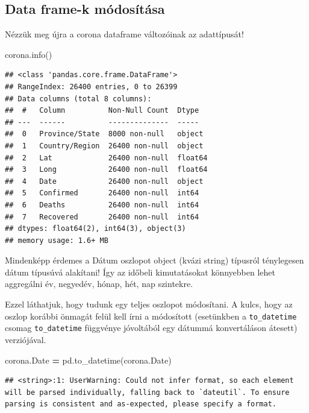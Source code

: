 \documentclass[
]{book}
\newenvironment{Shaded}{\begin{snugshade}}{\end{snugshade}}
\newcommand{\NormalTok}[1]{#1}
\newcommand{\OperatorTok}[1]{\textcolor[rgb]{0.81,0.36,0.00}{\textbf{#1}}}
\begin{document}
\subsection{Data frame-k módosítása}\label{data-frame-k-muxf3dosuxedtuxe1sa}

Nézzük meg újra a corona dataframe változóinak az adattípusát!

\begin{Shaded}
\begin{Highlighting}[]
\NormalTok{corona.info()}
\end{Highlighting}
\end{Shaded}

\begin{verbatim}
## <class 'pandas.core.frame.DataFrame'>
## RangeIndex: 26400 entries, 0 to 26399
## Data columns (total 8 columns):
##  #   Column          Non-Null Count  Dtype  
## ---  ------          --------------  -----  
##  0   Province/State  8000 non-null   object 
##  1   Country/Region  26400 non-null  object 
##  2   Lat             26400 non-null  float64
##  3   Long            26400 non-null  float64
##  4   Date            26400 non-null  object 
##  5   Confirmed       26400 non-null  int64  
##  6   Deaths          26400 non-null  int64  
##  7   Recovered       26400 non-null  int64  
## dtypes: float64(2), int64(3), object(3)
## memory usage: 1.6+ MB
\end{verbatim}

Mindenképp érdemes a Dátum oszlopot object (kvázi string) típusról ténylegesen dátum típusúvá alakítani! Így az időbeli kimutatásokat könnyebben lehet aggregálni év, negyedév, hónap, hét, nap szintekre.

Ezzel láthatjuk, hogy tudunk egy teljes oszlopot módosítani. A kulcs, hogy az oszlop korábbi önmagát felül kell írni a módosított (esetünkben a \texttt{to\_datetime} csomag \texttt{to\_datetime} függvénye jóvoltából egy dátummá konvertáláson átesett) verziójával.

\begin{Shaded}
\begin{Highlighting}[]
\NormalTok{corona.Date }\OperatorTok{=}\NormalTok{ pd.to\_datetime(corona.Date)}
\end{Highlighting}
\end{Shaded}

\begin{verbatim}
## <string>:1: UserWarning: Could not infer format, so each element will be parsed individually, falling back to `dateutil`. To ensure parsing is consistent and as-expected, please specify a format.
\end{verbatim}
\end{document}
